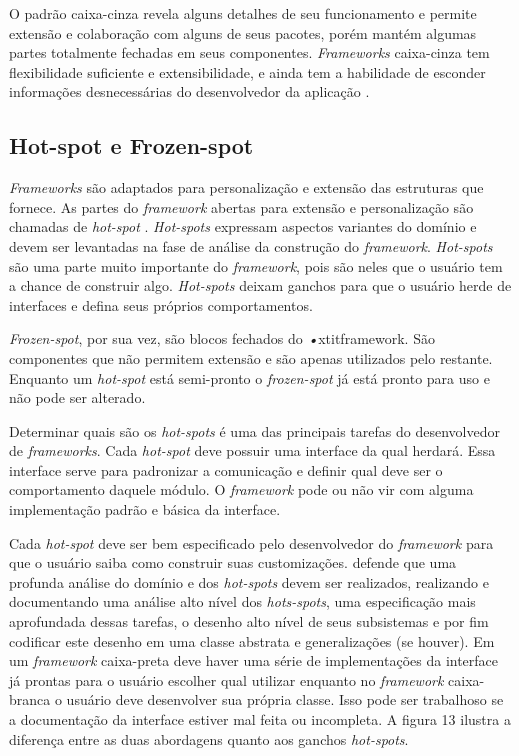 O padrão caixa-cinza revela alguns detalhes de seu funcionamento e permite extensão e colaboração com alguns de seus pacotes, porém mantém algumas partes totalmente fechadas em seus componentes. \textit{Frameworks} caixa-cinza tem flexibilidade suficiente e extensibilidade, e ainda tem a habilidade de esconder informações desnecessárias do desenvolvedor da aplicação \cite{Fayad1999}.

\subsection{Hot-spot e Frozen-spot}

\textit{Frameworks} são adaptados para personalização e extensão das estruturas que fornece. As partes do \textit{framework} abertas para extensão e personalização são chamadas de \textit{hot-spot} \cite{Fayad1999}. \textit{Hot-spots} expressam aspectos variantes do domínio e devem ser levantadas na fase de análise da construção do \textit{framework}. \textit{Hot-spots} são uma parte muito importante do \textit{framework}, pois são neles que o usuário tem a chance de construir algo. \textit{Hot-spots} deixam ganchos para que o usuário herde de interfaces e defina seus próprios comportamentos.

\textit{Frozen-spot}, por sua vez, são blocos fechados do \textit{•}xtit{framework}. São componentes que não permitem extensão e são apenas utilizados pelo restante. Enquanto um \textit{hot-spot} está semi-pronto o \textit{frozen-spot} já está pronto para uso e não pode ser alterado.

Determinar quais são os \textit{hot-spots} é uma das principais tarefas do desenvolvedor de \textit{frameworks}. Cada \textit{hot-spot} deve possuir uma interface da qual herdará. Essa interface serve para padronizar a comunicação e definir qual deve ser o comportamento daquele módulo. O \textit{framework} pode ou não vir com alguma implementação padrão e básica da interface.

Cada \textit{hot-spot} deve ser bem especificado pelo desenvolvedor do \textit{framework} para que o usuário saiba como construir suas customizações. \cite{Fayad1999} defende que uma profunda análise do domínio e dos \textit{hot-spots} devem ser realizados, realizando e documentando uma análise alto nível dos \textit{hots-spots}, uma especificação mais aprofundada dessas tarefas, o desenho alto nível de seus subsistemas e por fim codificar este desenho em uma classe abstrata e generalizações (se houver). Em um \textit{framework} caixa-preta deve haver uma série de implementações da interface já prontas para o usuário escolher qual utilizar enquanto no \textit{framework} caixa-branca o usuário deve desenvolver sua própria classe. Isso pode ser trabalhoso se a documentação da interface estiver mal feita ou incompleta. A figura 13 ilustra a diferença entre as duas abordagens quanto aos ganchos \textit{hot-spots}.

